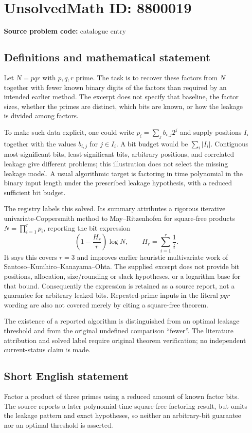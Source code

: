 \documentclass[11pt]{article}
\begin{document}
\section*{UnsolvedMath ID: 8800019}
\textbf{Source problem code:} catalogue entry
\subsection{Definitions and mathematical statement}
Let \(N=pqr\) with \(p,q,r\) prime. The task is to recover these factors from \(N\) together with fewer known binary digits of the factors than required by an intended earlier method. The excerpt does not specify that baseline, the factor sizes, whether the primes are distinct, which bits are known, or how the leakage is divided among factors.

To make such data explicit, one could write \(p_i=\sum_j b_{i,j}2^j\) and supply positions \(I_i\) together with the values \(b_{i,j}\) for \(j\in I_i\). A bit budget would be \(\sum_i|I_i|\). Contiguous most-significant bits, least-significant bits, arbitrary positions, and correlated leakage give different problems; this illustration does not select the missing leakage model. A usual algorithmic target is factoring in time polynomial in the binary input length under the prescribed leakage hypothesis, with a reduced sufficient bit budget.

The registry labels this solved. Its summary attributes a rigorous iterative univariate-Coppersmith method to May--Ritzenhofen for square-free products \(N=\prod_{i=1}^r p_i\), reporting the bit expression
\[
 \left(1-\frac{H_r}{r}\right)\log N,
 \qquad H_r=\sum_{i=1}^r\frac1i.
\]
It says this covers \(r=3\) and improves earlier heuristic multivariate work of Santoso--Kunihiro--Kanayama--Ohta. The supplied excerpt does not provide bit positions, allocation, size/rounding or slack hypotheses, or a logarithm base for that bound. Consequently the expression is retained as a source report, not a guarantee for arbitrary leaked bits. Repeated-prime inputs in the literal \(pqr\) wording are also not covered merely by citing a square-free theorem.

The existence of a reported algorithm is distinguished from an optimal leakage threshold and from the original undefined comparison ``fewer''. The literature attribution and solved label require original theorem verification; no independent current-status claim is made.
\subsection{Short English statement}
Factor a product of three primes using a reduced amount of known factor bits. The source reports a later polynomial-time square-free factoring result, but omits the leakage pattern and exact hypotheses, so neither an arbitrary-bit guarantee nor an optimal threshold is asserted.
\end{document}
